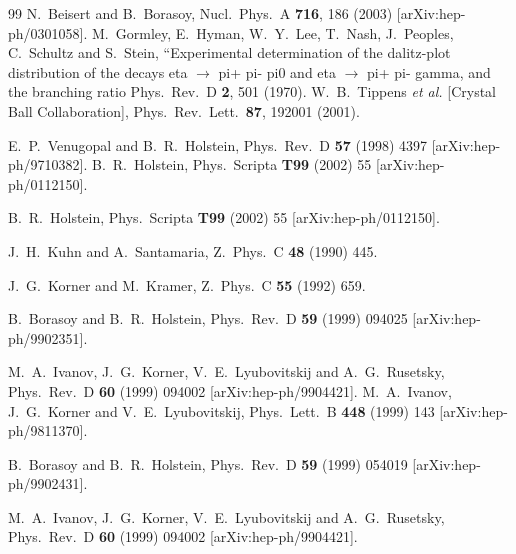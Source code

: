 \documentclass{article}
\begin{document}
\begin{thebibliography}{99}
  N.~Beisert and B.~Borasoy,
  Nucl.\ Phys.\  A {\bf 716}, 186 (2003)
  [arXiv:hep-ph/0301058].
  M.~Gormley, E.~Hyman, W.~Y.~Lee, T.~Nash, J.~Peoples, C.~Schultz and S.~Stein,
   ``Experimental determination of the dalitz-plot distribution of the decays
   eta $\to$ pi+ pi- pi0 and eta $\to$ pi+ pi- gamma, and the branching ratio
  Phys.\ Rev.\  D {\bf 2}, 501 (1970).
  W.~B.~Tippens {\it et al.}  [Crystal Ball Collaboration],
  Phys.\ Rev.\ Lett.\  {\bf 87}, 192001 (2001).

 E.~P.~Venugopal and B.~R.~Holstein,
Phys.\ Rev.\  D {\bf 57} (1998) 4397 [arXiv:hep-ph/9710382].
 B.~R.~Holstein,
 Phys.\ Scripta {\bf T99} (2002) 55 [arXiv:hep-ph/0112150].

 B.~R.~Holstein,
 Phys.\ Scripta {\bf T99} (2002) 55 [arXiv:hep-ph/0112150].

 J.~H.~Kuhn and A.~Santamaria,
Z.\ Phys.\  C {\bf 48} (1990) 445.

J.~G.~Korner and M.~Kramer,
Z.\ Phys.\  C {\bf 55} (1992) 659.

B.~Borasoy and B.~R.~Holstein,
Phys.\ Rev.\  D {\bf 59} (1999) 094025 [arXiv:hep-ph/9902351].

M.~A.~Ivanov, J.~G.~Korner, V.~E.~Lyubovitskij and A.~G.~Rusetsky,
Phys.\ Rev.\  D {\bf 60} (1999) 094002
[arXiv:hep-ph/9904421].
M.~A.~Ivanov, J.~G.~Korner and V.~E.~Lyubovitskij,
Phys.\ Lett.\  B {\bf 448} (1999) 143 [arXiv:hep-ph/9811370].

B.~Borasoy and B.~R.~Holstein,
Phys.\ Rev.\  D {\bf 59} (1999) 054019 [arXiv:hep-ph/9902431].

M.~A.~Ivanov, J.~G.~Korner, V.~E.~Lyubovitskij and A.~G.~Rusetsky,
Phys.\ Rev.\  D {\bf 60} (1999) 094002
[arXiv:hep-ph/9904421].

\end{thebibliography}
\end{document}
